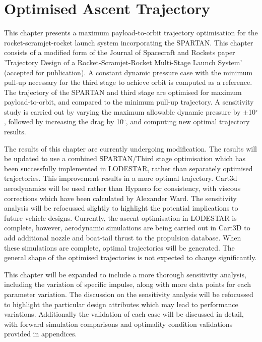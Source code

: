 
\cleardoublepage
\chapter{Optimised Ascent Trajectory}\label{chapter:Ascent}

This chapter presents a maximum payload-to-orbit trajectory optimisation for the rocket-scramjet-rocket launch system incorporating the SPARTAN. 
This chapter consists of a modified form of the Journal of Spacecraft and Rockets paper 'Trajectory Design of a Rocket-Scramjet-Rocket Multi-Stage Launch System' (accepted for publication). 
A constant dynamic pressure case with the minimum pull-up necessary for the third stage to achieve orbit is computed as a reference. The trajectory of the SPARTAN and third stage are optimised for maximum payload-to-orbit, and compared to the minimum pull-up trajectory. A sensitivity study is carried out by varying the maximum allowable dynamic pressure by $\pm$10$^\circ$, followed by increasing the drag by 10$^\circ$, and computing new optimal trajectory results. 

The results of this chapter are currently undergoing modification. 
The results will be updated to use a combined SPARTAN/Third stage optimisation which has been successfully implemented in LODESTAR, rather than separately optimised trajectories. This improvement results in a more optimal trajectory. Cart3d aerodynamics will be used rather than Hypaero for consistency, with viscous corrections which have been calculated by Alexander Ward. The sensitivity analysis will be refocussed slightly to highlight the potential implications to future vehicle designs. 
Currently, the ascent optimisation in LODESTAR is complete, however, aerodynamic simulations are being carried out in Cart3D to add additional nozzle and boat-tail thrust to the propulsion database. When these simulations are complete, optimal trajectories will be generated. The general shape of the optimised trajectories is not expected to change significantly. 

This chapter will be expanded to include a more thorough sensitivity analysis, including the variation of specific impulse, along with more data points for each parameter variation. The discussion on the sensitivity analysis will be refocussed to highlight the particular design attributes which may lead to performance variations.
Additionally the validation of each case will be discussed in detail, with forward simulation comparisons and optimality condition validations provided in appendices. 



